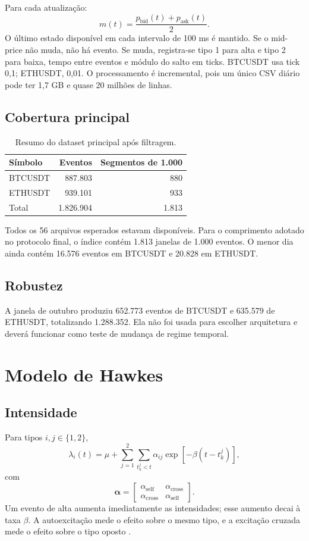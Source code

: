 \documentclass[12pt,a4paper]{report}
\begin{document}
Para cada atualização:
\[
  m(t)=\frac{p_{\mathrm{bid}}(t)+p_{\mathrm{ask}}(t)}{2}.
\]
O último estado disponível em cada intervalo de 100 ms é mantido. Se o mid-price não
muda, não há evento. Se muda, registra-se tipo 1 para alta e tipo 2 para baixa, tempo
entre eventos e módulo do salto em ticks. BTCUSDT usa tick 0,1; ETHUSDT, 0,01.
O processamento é incremental, pois um único CSV diário pode ter 1,7 GB e quase
20 milhões de linhas.

\section{Cobertura principal}

\begin{table}[ht]
\centering
\caption{Resumo do dataset principal após filtragem.}
\begin{tabular}{lrr}
\toprule
Símbolo & Eventos & Segmentos de 1.000\\
\midrule
BTCUSDT & 887.803 & 880\\
ETHUSDT & 939.101 & 933\\
\midrule
Total & 1.826.904 & 1.813\\
\bottomrule
\end{tabular}
\end{table}

Todos os 56 arquivos esperados estavam disponíveis. Para o comprimento adotado no
protocolo final, o índice contém 1.813 janelas de 1.000 eventos. O menor dia ainda
contém 16.576 eventos em BTCUSDT e 20.828 em ETHUSDT.

\section{Robustez}

A janela de outubro produziu 652.773 eventos de BTCUSDT e 635.579 de ETHUSDT,
totalizando 1.288.352. Ela não foi usada para escolher arquitetura e deverá funcionar
como teste de mudança de regime temporal.

\chapter{Modelo de Hawkes}

\section{Intensidade}

Para tipos \(i,j\in\{1,2\}\),
\[
\lambda_i(t)=\mu+\sum_{j=1}^{2}\sum_{t_k^j<t}
  \alpha_{ij}\exp[-\beta(t-t_k^j)],
\]
com
\[
\boldsymbol{\alpha}=
\begin{bmatrix}
\alpha_{\mathrm{self}} & \alpha_{\mathrm{cross}}\\
\alpha_{\mathrm{cross}} & \alpha_{\mathrm{self}}
\end{bmatrix}.
\]
Um evento de alta aumenta imediatamente as intensidades; esse aumento decai à taxa
\(\beta\). A autoexcitação mede o efeito sobre o mesmo tipo, e a excitação cruzada
mede o efeito sobre o tipo oposto \citep{hawkes1971,bacry2013}.
\end{document}
